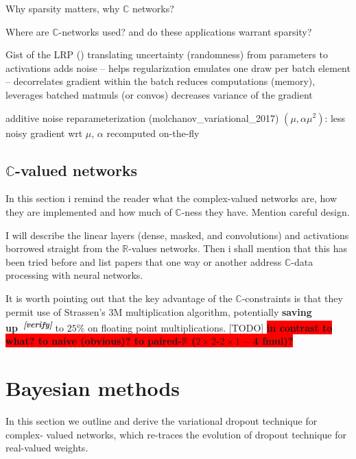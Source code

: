 \documentclass[a4paper,10pt]{article}
\newcommand{\real}{\mathbb{R}}
\newcommand{\cplx}{\mathbb{C}}
\newcommand{\important}[1]{\textbf{\colorbox{red}{#1}}}
\newcommand{\attn}[2]{\textbf{\color{red} #2~\textsuperscript{\textit{[#1]}}}}
\newcommand{\verify}[1]{\attn{verify}{#1}}
\newcommand{\todo}[1]{{\color{blue} [TODO]} \important{#1}}
\begin{document}
Why sparsity matters, why $\cplx$ networks?

Where are $\cplx$-networks used? and do these applications warrant sparsity?

Gist of the LRP (\cite{kingma_variational_2015})
translating uncertainty (randomness) from parameters to activations
  adds noise -- helps regularization
  emulates one draw per batch element -- decorrelates gradient within the batch
  reduces computations (memory), leverages batched matmuls (or convos)
  decreases variance of the gradient

additive noise reparameterization (molchanov\_variational\_2017) $(\mu, \alpha \mu^2)$:
  less noisy gradient wrt $\mu$, $\alpha$ recomputed on-the-fly

\subsection{$\cplx$-valued networks} %
\label{sub:c_valued_networks}

In this section i remind the reader what the complex-valued networks are, how
they are implemented and how much of $\cplx$-ness they have. Mention careful
design.

I will describe the linear layers (dense, masked, and convolutions) and
activations borrowed straight from the $\real$-values networks. Then i shall
mention that this has been tried before and list papers that one way or another
address $\cplx$-data processing with neural networks.


It is worth pointing out that the key advantage of
the $\cplx$-constraints is that they permit use of Strassen's $3$M multiplication algorithm,
potentially \verify{saving up} to $25\%$ on floating point multiplications. \todo{
  in contrast to what? to na{\:i}ve (obvious)? to paired-$\real$ ($2 \times 2$-$2\times 1$
  -- 4 fmul)?
}


\section{Bayesian methods} %
\label{sec:bayesian_methods}

In this section we outline and derive the variational dropout technique for complex-%
valued networks, which re-traces the evolution of dropout technique for real-valued
weights.
\end{document}
